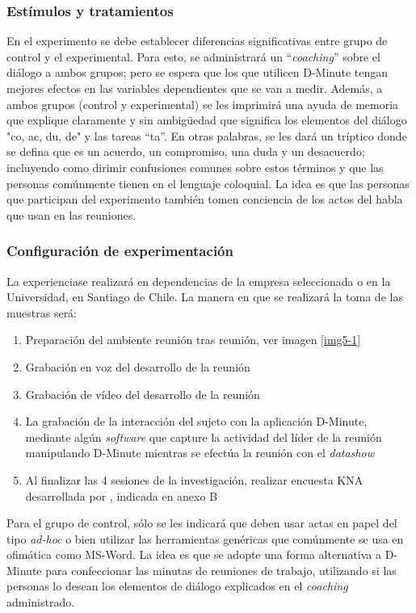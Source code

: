 \subsubsection{Estímulos y tratamientos}

En el experimento se debe establecer diferencias significativas entre grupo de control y el experimental. Para esto, se administrará un “\textit{coaching}” sobre el diálogo a ambos grupos; pero se espera que los que utilicen D-Minute tengan mejores efectos en las variables dependientes que se van a medir. Además, a ambos grupos (control y experimental) se les imprimirá una ayuda de memoria que explique claramente y sin ambigüedad que significa los elementos del diálogo "co, ac, du, de" y las tareas “ta”. En otras palabras, se les dará un tríptico donde se defina que es un acuerdo, un compromiso, una duda y un desacuerdo; incluyendo como dirimir confusiones comunes sobre estos términos y que las personas comúnmente tienen en el lenguaje coloquial. La idea es que las personas que participan del experimento también tomen conciencia de los actos del habla  que usan en las reuniones.

\subsubsection{Configuración de experimentación}

La experienciase realizará en dependencias de la empresa seleccionada o en la Universidad, en Santiago de Chile. La manera en que se realizará la toma de las muestras será:

\begin{enumerate}[1.]
	\item Preparación del ambiente reunión tras reunión, ver imagen \ref{img5-1}
	\item Grabación en voz del desarrollo de la reunión 
	\item Grabación de vídeo del desarrollo de la reunión
	\item La grabación de la interacción del sujeto con la aplicación D-Minute, mediante algún \textit{software} que capture la actividad del líder de la reunión manipulando D-Minute mientras se efectúa la reunión con el \textit{datashow}
	\item Al finalizar las 4 sesiones de la investigación, realizar encuesta KNA desarrollada por , indicada en anexo B
\end{enumerate}

Para el grupo de control, sólo se les indicará que deben usar actas en papel del tipo \textit{ad-hoc} o bien utilizar las herramientas genéricas que comúnmente se usa en ofimática como MS-Word. La idea es que se adopte una forma alternativa a D-Minute para confeccionar las minutas de reuniones de trabajo, utilizando si las personas lo desean los elementos de diálogo explicados en el \textit{coaching} administrado.

